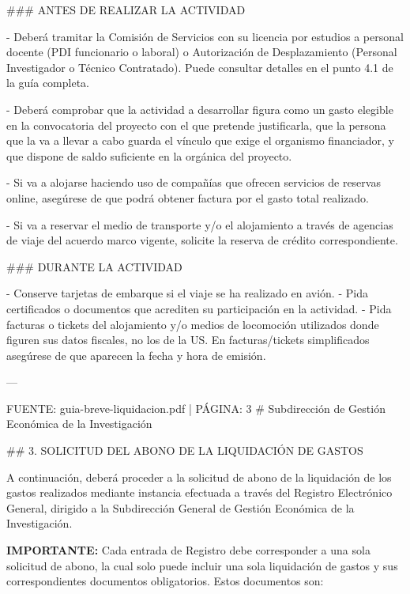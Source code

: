 \documentclass{article}
\begin{document}
\begin{itemize}
\begin{itemize}
\begin{scriptsize}
                  \#\#\# ANTES DE REALIZAR LA ACTIVIDAD

                  - Deberá tramitar la Comisión de Servicios con su licencia por estudios a personal docente (PDI funcionario o laboral) o Autorización de Desplazamiento (Personal Investigador o Técnico Contratado). Puede consultar detalles en el punto 4.1 de la guía completa.

                  - Deberá comprobar que la actividad a desarrollar figura como un gasto elegible en la convocatoria del proyecto con el que pretende justificarla, que la persona que la va a llevar a cabo guarda el vínculo que exige el organismo financiador, y que dispone de saldo suficiente en la orgánica del proyecto.

                  - Si va a alojarse haciendo uso de compañías que ofrecen servicios de reservas online, asegúrese de que podrá obtener factura por el gasto total realizado.

                  - Si va a reservar el medio de transporte y/o el alojamiento a través de agencias de viaje del acuerdo marco vigente, solicite la reserva de crédito correspondiente.

                  \#\#\# DURANTE LA ACTIVIDAD

                  - Conserve tarjetas de embarque si el viaje se ha realizado en avión.
                  - Pida certificados o documentos que acrediten su participación en la actividad.
                  - Pida facturas o tickets del alojamiento y/o medios de locomoción utilizados donde figuren sus datos fiscales, no los de la US. En facturas/tickets simplificados asegúrese de que aparecen la fecha y hora de emisión.

                  ---

                  FUENTE: guia-breve-liquidacion.pdf | PÁGINA: 3
                  \# Subdirección de Gestión Económica de la Investigación

                  \#\# 3. SOLICITUD DEL ABONO DE LA LIQUIDACIÓN DE GASTOS

                  A continuación, deberá proceder a la solicitud de abono de la liquidación de los gastos realizados mediante instancia efectuada a través del Registro Electrónico General, dirigido a la Subdirección General de Gestión Económica de la Investigación.

                  \textbf{IMPORTANTE:} Cada entrada de Registro debe corresponder a una sola solicitud de abono, la cual solo puede incluir una sola liquidación de gastos y sus correspondientes documentos obligatorios. Estos documentos son:


\end{scriptsize}
\end{itemize}
\end{itemize}
\end{document}
